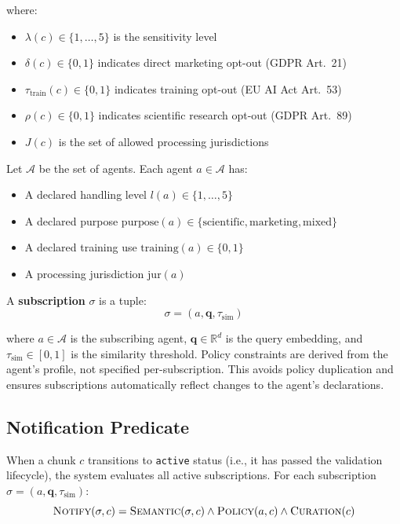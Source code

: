 \documentclass[11pt]{article}
\begin{document}
\noindent where:
\begin{itemize}[leftmargin=*]
\item $\lambda(c) \in \{1, \ldots, 5\}$ is the sensitivity level
\item $\delta(c) \in \{0, 1\}$ indicates direct marketing opt-out (GDPR Art.~21)
\item $\tau_{\text{train}}(c) \in \{0, 1\}$ indicates training opt-out (EU AI Act Art.~53)
\item $\rho(c) \in \{0, 1\}$ indicates scientific research opt-out (GDPR Art.~89)
\item $J(c)$ is the set of allowed processing jurisdictions
\end{itemize}

Let $\mathcal{A}$ be the set of agents. Each agent $a \in \mathcal{A}$ has:
\begin{itemize}[leftmargin=*]
\item A declared handling level $l(a) \in \{1, \ldots, 5\}$
\item A declared purpose $\text{purpose}(a) \in \{\text{scientific}, \text{marketing}, \text{mixed}\}$
\item A declared training use $\text{training}(a) \in \{0, 1\}$
\item A processing jurisdiction $\text{jur}(a)$
\end{itemize}

A \textbf{subscription} $\sigma$ is a tuple:
\begin{equation}
\sigma = (a, \mathbf{q}, \tau_{\text{sim}})
\end{equation}

\noindent where $a \in \mathcal{A}$ is the subscribing agent, $\mathbf{q} \in \mathbb{R}^d$ is the query embedding, and $\tau_{\text{sim}} \in [0, 1]$ is the similarity threshold. Policy constraints are derived from the agent's profile, not specified per-subscription. This avoids policy duplication and ensures subscriptions automatically reflect changes to the agent's declarations.

\subsection{Notification Predicate}

When a chunk $c$ transitions to \texttt{active} status (i.e., it has passed the validation lifecycle), the system evaluates all active subscriptions. For each subscription $\sigma = (a, \mathbf{q}, \tau_{\text{sim}})$:
\begin{equation}
\textsc{Notify}(\sigma, c) = \textsc{Semantic}(\sigma, c) \wedge \textsc{Policy}(a, c) \wedge \textsc{Curation}(c)
\end{equation}
\end{document}
